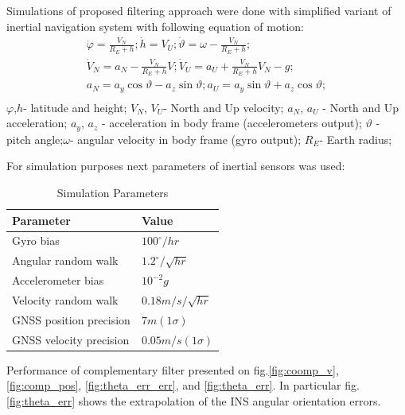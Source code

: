 \documentclass[conference, utf8]{IEEEtran}
\begin{document}
Simulations of proposed filtering approach were done with simplified variant of inertial navigation system with following equation of motion:
\begin{equation}
\begin{array}{l}
  \displaystyle \dot{\varphi }=\frac{V_{N} }{R_{E} +h} ; \dot{h}=V_{U} ; \dot{\vartheta }=\omega -\frac{V_{N} }{R_{E} +h} ;\\
  \displaystyle \dot{V}_{N} =a_{N} -\frac{V_{N} }{R_{E} +h} V; \dot{V}_{U} =a_{U} +\frac{V_{N} }{R_{E} +h} V_{N} -g;\\
  \displaystyle a_{N} =a_{y} \cos \vartheta -a_{z} \sin \vartheta ; a_{U} =a_{y} \sin \vartheta +a_{z} \cos \vartheta ;\\
  \end{array} 
  \label{eq:ins}
\end{equation}
$\varphi$,$h$- latitude and height; 
$V_{N}$, $V_{U}$- North and Up velocity; 
$a_{N}$, $a_{U}$ - North and Up acceleration; 
$a_{y}$, $a_{z}$ - acceleration in body frame (accelerometers output); 
$\vartheta$ - pitch angle;$\omega $- angular velocity in body frame (gyro output); 
$R_{E}$- Earth radius;

For simulation purposes next parameters of inertial sensors was used:
\begin{table}[!t]\footnotesize
\centering
\renewcommand{\arraystretch}{1.3}
  \caption{Simulation Parameters}
    \begin{tabular}{|l|p{50mm}|} \hline 
      Parameter & Value \\ \hline  \hline 
      Gyro bias & $100^{\circ } /hr$ \\ \hline 
      Angular random walk & $1.2^{\circ } /\sqrt{hr} $ \\ \hline 
      Accelerometer bias & $10^{-2} g$ \\ \hline 
      Velocity random walk & $0.18m/s/\sqrt{hr} $ \\ \hline 
      GNSS position precision & $7m(1\sigma )$ \\ \hline 
      GNSS velocity precision & $0.05m/s(1\sigma )$ \\ \hline 
    \end{tabular}
  \label{tab:sim}
 \end{table}


Performance of complementary filter presented on fig.\ref{fig:coomp_v}, \ref{fig:comp_pos}, \ref{fig:theta_err_err}, 
and \ref{fig:theta_err}. In particular fig. \ref{fig:theta_err} shows the extrapolation 
of the INS angular orientation errors. 
\end{document}
